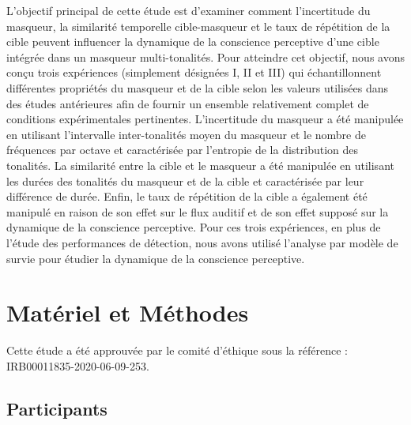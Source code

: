 L'objectif principal de cette étude est d'examiner comment l'incertitude du masqueur, la similarité temporelle cible-masqueur et le taux de répétition de la cible peuvent influencer la dynamique de la conscience perceptive d'une cible intégrée dans un masqueur multi-tonalités. 
Pour atteindre cet objectif, nous avons conçu trois expériences (simplement désignées I, II et III) qui échantillonnent différentes propriétés du masqueur et de la cible selon les valeurs utilisées dans des études antérieures \citep{akram2014investigating, elhilali2009interaction, elhilali2009temporal, giani2015detecting, gutschalk2008neural, wiegand2012correlates, wiegand2018cortical} afin de fournir un ensemble relativement complet de conditions expérimentales pertinentes. 
L'incertitude du masqueur a été manipulée en utilisant l'intervalle inter-tonalités moyen du masqueur et le nombre de fréquences par octave et caractérisée par l'entropie de la distribution des tonalités. 
La similarité entre la cible et le masqueur a été manipulée en utilisant les durées des tonalités du masqueur et de la cible et caractérisée par leur différence de durée. 
Enfin, le taux de répétition de la cible a également été manipulé en raison de son effet sur le flux auditif et de son effet supposé sur la dynamique de la conscience perceptive. 
Pour ces trois expériences, en plus de l'étude des performances de détection, nous avons utilisé l'analyse par modèle de survie pour étudier la dynamique de la conscience perceptive.

\section{Matériel et Méthodes}
\label{chapitre4materielmethodes}

Cette étude a été approuvée par le comité d'éthique sous la référence : IRB00011835-2020-06-09-253. 

\subsection{Participants}
\label{chapitre4particpants}

